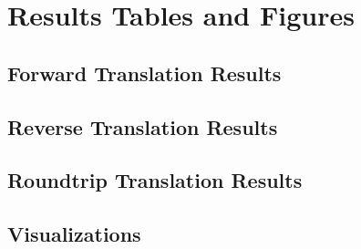 \section{Results Tables and Figures}

\subsection{Forward Translation Results}




\subsection{Reverse Translation Results}


\subsection{Roundtrip Translation Results}


\subsection{Visualizations}
